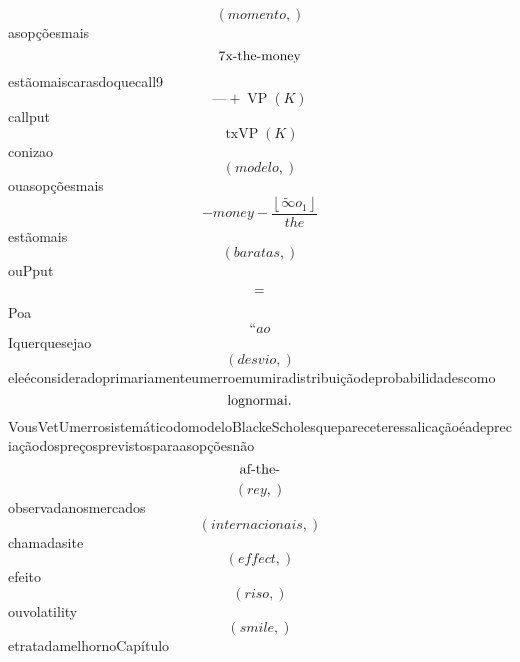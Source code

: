 \documentclass{article}
\begin{document}
\begin{equation}
\left( momento,\right)
\end{equation}asopçõesmais\begin{equation}
$7x-the-money$
\end{equation}estãomaiscarasdoquecall9\begin{equation}
— + \operatorname{VP}{\left(K \right)}
\end{equation}callput\begin{equation}
\operatorname{txVP}{\left(K \right)}
\end{equation}conizao\begin{equation}
\left( modelo,\right)
\end{equation}ouasopçõesmais\begin{equation}
- money - \frac{\left\lfloor{\tilde{\infty} o_{1}}\right\rfloor}{the}
\end{equation}estãomais\begin{equation}
\left( baratas,\right)
\end{equation}ouPput\begin{equation}
$=$
\end{equation}Poa\begin{equation}
“ao
\end{equation}Iquerquesejao\begin{equation}
\left( desvio,\right)
\end{equation}eleéconsideradoprimariamenteumerroemumiradistribuiçãodeprobabilidadescomo\begin{equation}
$lognormai.$
\end{equation}VousVetUmerrosistemáticodomodeloBlackeScholesquepareceteressalicaçãoéadepreciaçãodospreçosprevistosparaasopçõesnão\begin{equation}
$af-the-$
\end{equation}\begin{equation}
\left( rey,\right)
\end{equation}observadanosmercados\begin{equation}
\left( internacionais,\right)
\end{equation}chamadasite\begin{equation}
\left( effect,\right)
\end{equation}efeito\begin{equation}
\left( riso,\right)
\end{equation}ouvolatility\begin{equation}
\left( smile,\right)
\end{equation}etratadamelhornoCapítulo\begin{equation}

\end{equation}
\end{document}

